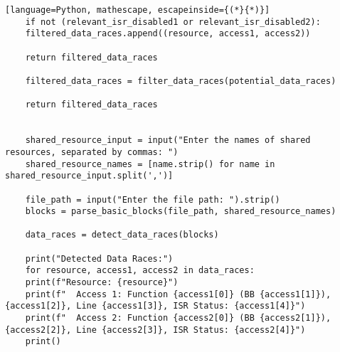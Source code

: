 \documentclass[
fancyheadings, %
%
%
]{stsreprt}
\begin{document}
\begin{lstlisting}[language=Python, mathescape, escapeinside={(*}{*)}]
	if not (relevant_isr_disabled1 or relevant_isr_disabled2):
	filtered_data_races.append((resource, access1, access2))
	
	return filtered_data_races
	
	filtered_data_races = filter_data_races(potential_data_races)
	
	return filtered_data_races
	
	
	shared_resource_input = input("Enter the names of shared resources, separated by commas: ")
	shared_resource_names = [name.strip() for name in shared_resource_input.split(',')]
	
	file_path = input("Enter the file path: ").strip()
	blocks = parse_basic_blocks(file_path, shared_resource_names)
	
	data_races = detect_data_races(blocks)
	
	print("Detected Data Races:")
	for resource, access1, access2 in data_races:
	print(f"Resource: {resource}")
	print(f"  Access 1: Function {access1[0]} (BB {access1[1]}), {access1[2]}, Line {access1[3]}, ISR Status: {access1[4]}")
	print(f"  Access 2: Function {access2[0]} (BB {access2[1]}), {access2[2]}, Line {access2[3]}, ISR Status: {access2[4]}")
	print()
\end{lstlisting}
\end{document}
